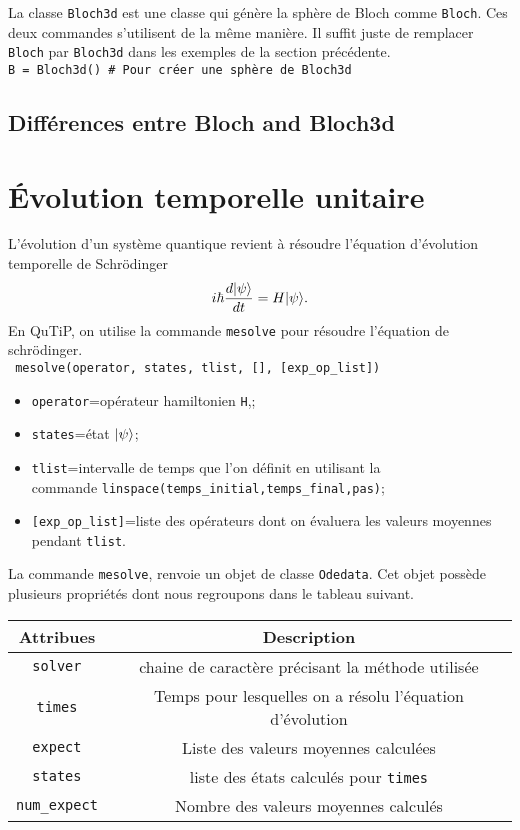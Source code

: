 \begin{itemize}
La classe \texttt{Bloch3d} est une classe qui génère la sphère de Bloch comme 
\texttt{Bloch}. Ces deux commandes s'utilisent de la même manière. Il suffit 
juste de remplacer \texttt{Bloch} par \texttt{Bloch3d} dans les exemples de la 
section précédente.\\
\texttt{B = Bloch3d() # Pour créer une sphère de Bloch3d}

\subsection{Différences entre Bloch and Bloch3d}


\section{Évolution temporelle unitaire}
L'évolution d'un système quantique revient à résoudre l'équation d'évolution 
temporelle de Schr\"odinger
\begin{equation}
i\hbar\dfrac{d\vert\psi\rangle}{dt}=H\vert\psi\rangle.
\end{equation}
En QuTiP, on utilise la commande \texttt{mesolve} pour résoudre l'équation de 
schr\"odinger.\\
\texttt{ mesolve(operator, states, tlist, [], [exp\_op\_list])}
\begin{itemize}
\item \texttt{operator}=opérateur hamiltonien \texttt{H},;
\item \texttt{states}=état $\vert\psi\rangle$;
\item \texttt{tlist}=intervalle de temps que l'on définit en utilisant la\\
commande \texttt{linspace(temps\_initial,temps\_final,pas)};
\item \texttt{[exp\_op\_list]}=liste des opérateurs dont on évaluera les valeurs
moyennes pendant \texttt{tlist}.
\end{itemize}
La commande \texttt{mesolve}, renvoie un objet de classe \texttt{Odedata}. Cet 
objet possède plusieurs propriétés dont nous regroupons dans le tableau suivant.
\begin{center}
\begin{tabular}{|c|c|} \hline \hline
\textbf{Attribues} & \textbf{Description} \\ \hline \hline
\texttt{solver} & chaine de caractère précisant la méthode utilisée \\ \hline
\texttt{times} & Temps pour lesquelles on a résolu l'équation d'évolution\\ 
\hline
\texttt{expect} & Liste des valeurs moyennes calculées\\ \hline
\texttt{states} & liste des états calculés pour \texttt{times}\\ \hline
\texttt{num\_expect} & Nombre des valeurs moyennes calculés\\ \hline
\end{tabular}
\end{center}


\end{itemize}
